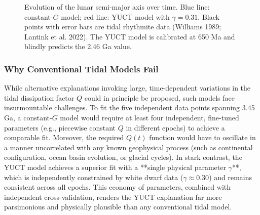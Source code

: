 \documentclass[12pt]{article}
\theoremstyle{remark}
\begin{document}
	\begin{figure}[htbp]
		\centering
		\caption{Evolution of the lunar semi-major axis over time. Blue line: constant-$G$ model; red line: YUCT model with $\gamma=0.31$. Black points with error bars are tidal rhythmite data (Williams 1989; Lantink et al. 2022). The YUCT model is calibrated at 650 Ma and blindly predicts the 2.46 Ga value.}
		\label{fig:moon-evolution}
	\end{figure}
	
	\subsubsection{Why Conventional Tidal Models Fail}
	While alternative explanations invoking large, time-dependent variations in the tidal dissipation factor \(Q\) could in principle be proposed, such models face insurmountable challenges. To fit the five independent data points spanning 3.45 Ga, a constant-\(G\) model would require at least four independent, fine-tuned parameters (e.g., piecewise constant \(Q\) in different epochs) to achieve a comparable fit. Moreover, the required \(Q(t)\) function would have to oscillate in a manner uncorrelated with any known geophysical process (such as continental configuration, ocean basin evolution, or glacial cycles). In stark contrast, the YUCT model achieves a superior fit with a **single physical parameter \(\gamma\)**, which is independently constrained by white dwarf data (\(\gamma \approx 0.30\)) and remains consistent across all epochs. This economy of parameters, combined with independent cross-validation, renders the YUCT explanation far more parsimonious and physically plausible than any conventional tidal model.
	
\end{document}
